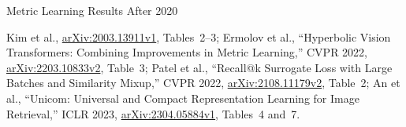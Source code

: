 \begin{frame}{Metric Learning Results After 2020}
\begin{itemize}
  \end{itemize}
  \vspace{0.1em}
  {\scriptsize Kim et al., \href{https://arxiv.org/abs/2003.13911v1}{arXiv:2003.13911v1}, Tables~2--3; Ermolov et al., ``Hyperbolic Vision Transformers: Combining Improvements in Metric Learning,'' CVPR 2022, \href{https://arxiv.org/abs/2203.10833v2}{arXiv:2203.10833v2}, Table~3; Patel et al., ``Recall@k Surrogate Loss with Large Batches and Similarity Mixup,'' CVPR 2022, \href{https://arxiv.org/abs/2108.11179v2}{arXiv:2108.11179v2}, Table~2; An et al., ``Unicom: Universal and Compact Representation Learning for Image Retrieval,'' ICLR 2023, \href{https://arxiv.org/abs/2304.05884v1}{arXiv:2304.05884v1}, Tables~4 and~7.\par}
\end{frame}
